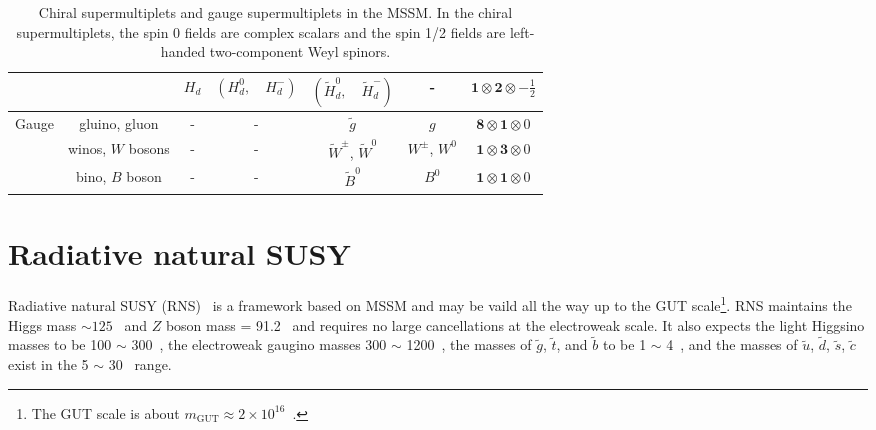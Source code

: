 \begin{table}[htp]
{\begin{tabular}{ccccccc}
                                    &                                                            & $H_{d}$        & $(H^{0}_{d}, \quad H^{-}_{d})$                   & $(\widetilde{H}^{0}_{d}, \quad \widetilde{H}^{-}_{d})$ & -                  & $\mathbf{1} \otimes \mathbf{2} \otimes -\frac{1}{2}$\\
            \hline
            \hline
            \multirow{3}{*}{Gauge}  & gluino, gluon                                              & -              & -                                                & $\widetilde{g}$                                        & $g$                & $\mathbf{8} \otimes \mathbf{1} \otimes 0$\\
                                    & winos, $W$ bosons                                          & -              & -                                                & $\widetilde{W}^{\pm}$, $\widetilde{W}^{0}$             & $W^{\pm}$, $W^{0}$ & $\mathbf{1} \otimes \mathbf{3} \otimes 0$\\
                                    & bino, $B$ boson                                            & -              & -                                                & $\widetilde{B}^{0}$                                    & $B^{0}$            & $\mathbf{1} \otimes \mathbf{1} \otimes 0$\\
            \hline
            \hline
        \end{tabular}
    }
    \caption{Chiral supermultiplets and gauge supermultiplets in the MSSM.
    In the chiral supermultiplets, the spin 0 fields are complex scalars and the spin 1/2 fields are left-handed two-component Weyl spinors.}
    \label{tab:susy_particle_contents}
\end{table}%


\section{Radiative natural SUSY}
\label{sec:susy_rns}
Radiative natural SUSY (RNS)~\cite{Baer:2013xua, Baer:2012up, Baer:2012se, Baer:2012cf} is a framework based on MSSM and may be vaild all the way up to the GUT scale\footnote{The GUT scale is about $m_{\text{GUT}} \approx 2 \times 10^{16}$~{\GeV}.}.
RNS maintains the Higgs mass \mH $\sim 125$~{\GeV} and $Z$ boson mass \mZ = 91.2~{\GeV} and requires no large cancellations at the electroweak scale.
It also expects the light Higgsino masses to be 100 $\sim$ 300~{\GeV}, the electroweak gaugino masses 300 $\sim$ 1200~{\GeV}, the masses of $\tilde{g}$, $\tilde{t}$, and $\tilde{b}$ to be 1 $\sim$ 4~{\TeV}, and the masses of $\tilde{u}$, $\tilde{d}$, $\tilde{s}$, $\tilde{c}$ exist in the 5 $\sim$ 30~{\TeV} range.

